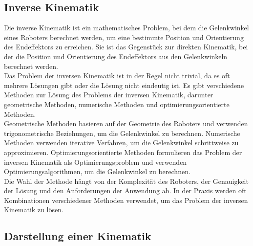 \subsection{Inverse Kinematik}\label{subsec:InverseKinematik}
Die inverse Kinematik ist ein mathematisches Problem, bei dem die Gelenkwinkel eines Roboters berechnet werden, um eine bestimmte Position und Orientierung des Endeffektors zu erreichen. Sie ist das Gegenstück zur direkten Kinematik, bei der die Position und Orientierung des Endeffektors aus den Gelenkwinkeln berechnet werden.\\
\noindent
Das Problem der inversen Kinematik ist in der Regel nicht trivial, da es oft mehrere Lösungen gibt oder die Lösung nicht eindeutig ist. Es gibt verschiedene Methoden zur Lösung des Problems der inversen Kinematik, darunter geometrische Methoden, numerische Methoden und optimierungsorientierte Methoden.\\
Geometrische Methoden basieren auf der Geometrie des Roboters und verwenden trigonometrische Beziehungen, um die Gelenkwinkel zu berechnen. Numerische Methoden verwenden iterative Verfahren, um die Gelenkwinkel schrittweise zu approximieren. Optimierungsorientierte Methoden formulieren das Problem der inversen Kinematik als Optimierungsproblem und verwenden Optimierungsalgorithmen, um die Gelenkwinkel zu berechnen.\\
Die Wahl der Methode hängt von der Komplexität des Roboters, der Genauigkeit der Lösung und den Anforderungen der Anwendung ab. In der Praxis werden oft Kombinationen verschiedener Methoden verwendet, um das Problem der inversen Kinematik zu lösen.\\

\subsection{Darstellung einer Kinematik}\label{subsec:DarstellungKinematik}

